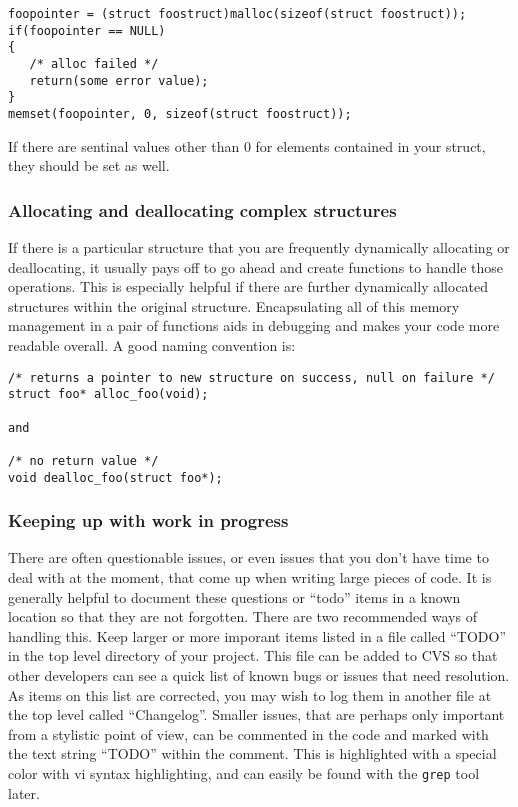 \documentclass[11pt, letterpaper]{article}
\begin{document}
\begin{verbatim}
foopointer = (struct foostruct)malloc(sizeof(struct foostruct));
if(foopointer == NULL)
{
   /* alloc failed */
   return(some error value);
}
memset(foopointer, 0, sizeof(struct foostruct));
\end{verbatim}

If there are sentinal values other than 0 for elements contained in your
struct, they should be set as well.

\subsubsection{Allocating and deallocating complex structures}

If there is a particular structure that you are frequently dynamically
allocating or deallocating, it usually pays off to go ahead and create
functions to handle those operations.  This is especially helpful if
there are further dynamically allocated structures within the original
structure.  Encapsulating all of this memory management in a pair of
functions aids in debugging and makes your code more readable overall.
A good naming convention is:

\begin{verbatim}
/* returns a pointer to new structure on success, null on failure */
struct foo* alloc_foo(void);  

and

/* no return value */
void dealloc_foo(struct foo*);
\end{verbatim}

\subsubsection{Keeping up with work in progress}

There are often questionable issues, or even issues that you don't have
time to deal with at the moment, that come up when writing large pieces
of code.  It is generally helpful to document these questions or
``todo''
items in a known location so that they are not forgotten.  There are two
recommended ways of handling this.  Keep larger or more imporant items
listed in a file called ``TODO'' in the top level directory of your
project.  This file can be added to CVS so that other developers can see
a quick list of known bugs or issues that need resolution.  As items on
this list are corrected, you may wish to log them in another file at the
top level called ``Changelog''.  Smaller issues, that are perhaps only
important from a stylistic point of view, can be commented in the code
and marked with the text string ``TODO'' within the comment.  This is highlighted with a
special color with vi syntax highlighting, and can easily be found with
the {\tt grep} tool later.
\end{document}
